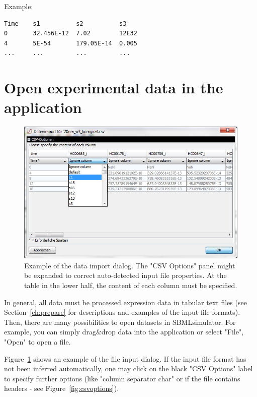 Example:
\begin{lstlisting}[caption={Input file example for experimental data},label={lst:input:exp},numbers=none,captionpos=t,float=h]
Time    s1          s2          s3
0       32.456E-12  7.02        12E32
4       5E-54       179.05E-14  0.005
...     ...         ...         ...
\end{lstlisting}

\section{Open experimental data in the application}
\label{sec:opendata}

\begin{figure}[h]
\centerline{\noindent\includegraphics[width=1.0\columnwidth]{figures/import_dialog.jpg}}
\caption{
Example of the data import dialog. The "CSV Options" panel might be expanded to correct auto-detected input file properties. At the table in the lower half, the content of each column must be specified.
}\label{fig:inputdialog}
\end{figure}

In general, all data must be processed expression data in tabular text files (see Section~\ref{ch:prepare} for descriptions and examples of the input file formats). Then, there are many possibilities to open datasets in SBMLsimulator. For example, you can simply drag\&drop data into the application or select "File", "Open" to open a file. 

Figure~\ref{fig:inputdialog} shows an example of the file input dialog. If the input file format has not been inferred automatically, one may click on the black "CSV Options" label to specify further options (like "column separator char" or if the file contains headers - see Figure~\ref{fig:csvoptions}).


